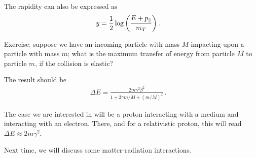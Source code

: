 \documentclass[main.tex]{subfiles}
\begin{document}
The rapidity can also be expressed as 
%
\begin{align}
y = \frac{1}{2} \log \qty(\frac{E + p_\parallel}{m_T})
\,.
\end{align}

Exercise: suppose we have an incoming particle with mass \(M\) impacting upon a particle with mass \(m\); what is the maximum transfer of energy from particle \(M\) to particle \(m\), if the collision is elastic? 

The result should be 
%
\begin{align}
\Delta E = \frac{2 m \gamma^2 \beta^2}{1 + 2 \gamma m/M + (m/M)^2}
\,.
\end{align}

The case we are interested in will be a proton interacting with a medium and interacting with an electron. There, and for a relativistic proton, this will read \(\Delta E \approx 2 m \gamma^2\). 

Next time, we will discuss some matter-radiation interactions. 
\end{document}
